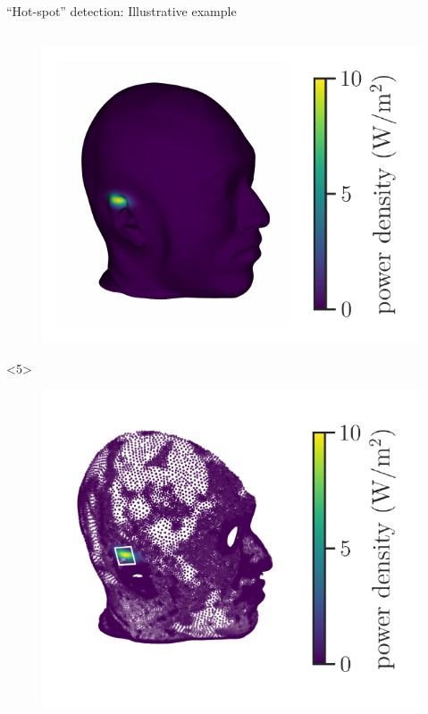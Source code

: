 \documentclass[xcolor=dvipsnames,10pt]{beamer}
\begin{document}
\begin{frame}{``Hot-spot'' detection: Illustrative example}
\begin{columns}[c]
\begin{column}{0.4\textwidth}
\begin{onlyenv}
\begin{center}
\begin{figure}
                    \includegraphics[width=\textwidth]{artwork/head.exposure.pdf}
                \end{figure}
                \end{center}
            \end{onlyenv}
            \begin{onlyenv}<5>
                \begin{center}
                \begin{figure}
                    \includegraphics[width=\textwidth]{artwork/head.pspd.pdf}
                \end{figure}

\end{center}
\end{onlyenv}
\end{column}
\end{columns}
\end{frame}
\end{document}
